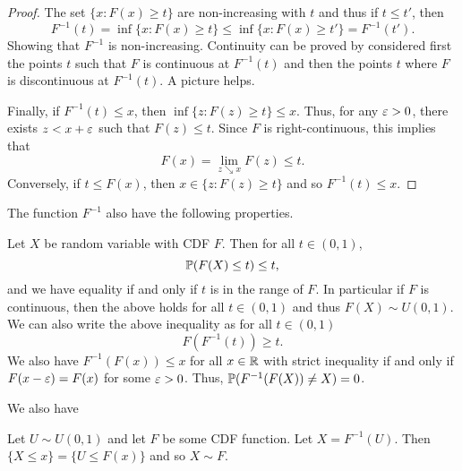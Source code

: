 \begin{proof}
    The set $\{x: F(x) \ge t\}$ are non-increasing with $t$ and thus if $t\le t'$, then
    \[F^{-1}(t) = \inf\{x : F(x) \ge t\}\le \inf\{x : F(x) \ge t'\} = F^{-1}(t'). \]
    Showing that $F^{-1}$ is non-increasing. Continuity can be proved by considered first the points $t$ such that $F$ is continuous at $F^{-1}(t)$ and then the points $t$ where $F$ is discontinuous at $F^{-1}(t)$. A picture helps.
    
    
    Finally, if $F^{-1}(t) \le x$, then $\inf\{z : F(z) \ge t\} \le x$. Thus, for any $\varepsilon > 0$, there exists $z < x+\varepsilon$ such that $F(z) \le t$. Since $F$ is right-continuous, this implies that 
    \[F(x) = \lim_{z \searrow x} F(z) \le t. \]
    Conversely, if $t \le F(x)$, then $x \in \{z : F(z) \ge t\}$ and so $F^{-1}(t) \le x$. 
\end{proof}
The function $F^{-1}$ also have the following properties.
\begin{proposition}
    Let $X$ be random variable with CDF $F$. Then for all $t \in (0,1)$,
    \[{\mathbb{P}}(F(X) \le t) \le t, \]
    and we have equality if and only if $t$ is in the range of $F$. In particular if $F$ is continuous, then the above holds for all $t \in (0,1)$ and thus $F(X) \sim U(0,1)$. We can also write the above inequality as for all $t \in (0,1)$
    \[F(F^{-1}(t)) \ge t. \]
    We also have $F^{-1}(F(x)) \le x$ for all $x \in {\mathbb R}$ with strict inequality if and only if $F(x-\varepsilon)=F(x)$ for some $\varepsilon > 0$. Thus, ${\mathbb{P}}(F^{-1}(F(X)) \neq X)=0$.
\end{proposition}
We also have
\begin{proposition}
    Let $U \sim U(0,1)$ and let $F$ be some CDF function. Let $X = F^{-1}(U)$. Then $\{X \le x\} = \{U \le F(x)\}$ and so $X \sim F$.
\end{proposition}

